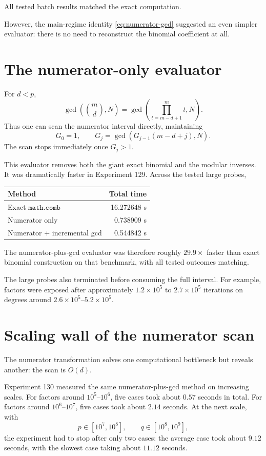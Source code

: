 \documentclass[11pt,a4paper]{article}
\begin{document}
All tested batch results matched the exact computation.

However, the main-regime identity \eqref{eq:numerator-gcd} suggested an even simpler evaluator: there is no need to reconstruct the binomial coefficient at all.

\section{The numerator-only evaluator}
\label{sec:numerator-evaluator}

For $d<p$,
\[
\gcd\!\left(\binom{m}{d},N\right)
=
\gcd\!\left(\prod_{t=m-d+1}^{m}t,N\right).
\]
Thus one can scan the numerator interval directly, maintaining
\begin{equation}
G_0=1,
\qquad
G_j=\gcd\!\left(G_{j-1}(m-d+j),N\right).
\end{equation}
The scan stops immediately once $G_j>1$.

This evaluator removes both the giant exact binomial and the modular inverses. It was dramatically faster in Experiment 129. Across the tested large probes,
\begin{center}
\begin{tabular}{lr}
\toprule
Method & Total time \\
\midrule
Exact $\texttt{math.comb}$ & 16.272648 s \\
Numerator only & 0.738909 s \\
Numerator + incremental gcd & 0.544842 s \\
\bottomrule
\end{tabular}
\end{center}
The numerator-plus-gcd evaluator was therefore roughly $29.9\times$ faster than exact binomial construction on that benchmark, with all tested outcomes matching.

The large probes also terminated before consuming the full interval. For example, factors were exposed after approximately $1.2\times10^5$ to $2.7\times10^5$ iterations on degrees around $2.6\times10^5$--$5.2\times10^5$.

\section{Scaling wall of the numerator scan}
\label{sec:scanwall}

The numerator transformation solves one computational bottleneck but reveals another: the scan is $O(d)$.

Experiment 130 measured the same numerator-plus-gcd method on increasing scales. For factors around $10^5$--$10^6$, five cases took about $0.57$ seconds in total. For factors around $10^6$--$10^7$, five cases took about $2.14$ seconds. At the next scale, with
\[
p\in[10^7,10^8],
\qquad q\in[10^8,10^9],
\]
the experiment had to stop after only two cases: the average case took about $9.12$ seconds, with the slowest case taking about $11.12$ seconds.
\end{document}
